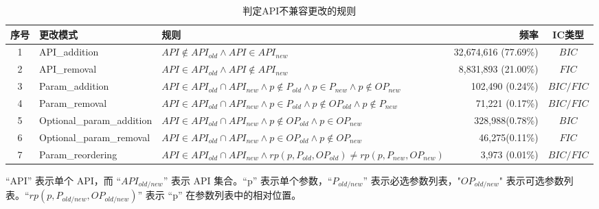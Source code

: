\begin{table*}
	\centering
	\begin{threeparttable}
		\caption{判定API不兼容更改的规则}
		\begin{tabularx}{\textwidth}{clXrc}
			\hline
			\textbf{序号} &\textbf{更改模式}&\textbf{规则}&\textbf{频率}&\textbf{IC类型}\\ 
			\hline
			1 & API\_addition &$API \notin API_{old} \land API \in API_{new} $&32,674,616 (77.69\%)&$BIC$\\
			2 & API\_removal & $API \in API_{old} \land API \notin API_{new} $ & 8,831,893 (21.00\%) &$FIC$\\
			3 & Param\_addition &$API\in API_{old} \cap API_{new}\land p \notin P_{old} \land p \in P_{new} \land p \notin OP_{new}$ & 102,490 (0.24\%)&$BIC/FIC$ \\
			4 & Param\_removal &$API\in API_{old} \cap API_{new}\land p \in P_{old} \land p \notin OP_{old}\land p \notin P_{new}$ & 71,221 (0.17\%)&$BIC/FIC$ \\
			5 & Optional\_param\_addition &$API\in API_{old} \cap API_{new}\land p \notin OP_{old} \land p \in OP_{new}$ &328,988(0.78\%) &$BIC$  \\
			6 & Optional\_param\_removal &$API\in API_{old} \cap API_{new} \land p \in OP_{old} \land p \notin OP_{new} $ & 46,275(0.11\%) &$FIC$ \\
			7 & Param\_reordering &$API\in API_{old} \cap API_{new} \land rp(p,P_{old}, OP_{old}) \neq rp(p,P_{new}, OP_{new})$& 3,973 (0.01\%) &$BIC/FIC$\\
			\hline
		\end{tabularx}
		\begin{tablenotes}[flushleft]
			\small 
			\item “API” 表示单个 API，而 “$API_{old/new}$” 表示 API 集合。“p” 表示单个参数，“$P_{old/new}$” 表示必选参数列表，"$OP_{old/new}$" 表示可选参数列表。“$rp(p, P_{old/new}, OP_{old/new})$” 表示 “p” 在参数列表中的相对位置。
		\end{tablenotes}
		\label{tab:rules}
	\end{threeparttable}
\end{table*}
